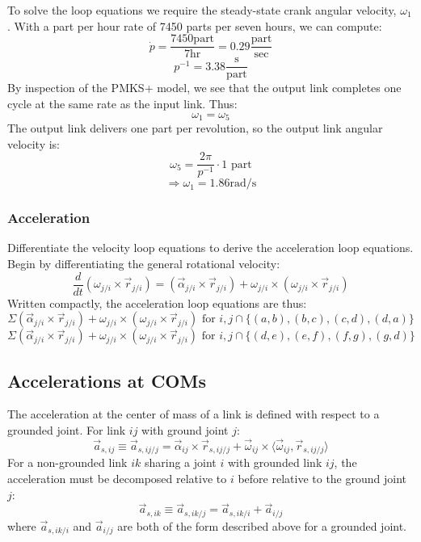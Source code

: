 \documentclass[12pt]{article}
\begin{document}
To solve the loop equations we require the steady-state crank angular velocity, $\omega_{1}$. With a part per hour rate of 7450 parts per seven hours, we can compute:
\[ \dot{p} = \frac{7450 \text{part}}{7 \text{hr}} = 0.29 \frac{\text{part}}{\text{sec}} \]
\[ p^{-1} = 3.38 \frac{\text{s}}{\text{part}} \]
By inspection of the PMKS+ model, we see that the output link completes one cycle at the same rate as the input link. Thus:
\[ \omega_{1} = \omega_{5} \]
The output link delivers one part per revolution, so the output link angular velocity is:
\[ \omega_{5} = \frac{2\pi}{p^{-1}}\cdot \text{1 part}  \]
\[ \Rightarrow \omega_{1} = 1.86 \text{rad}/\text{s} \]

\subsubsection{Acceleration}%
\label{eqns.kinematics.acceleration}

Differentiate the velocity loop equations to derive the acceleration loop equations. Begin by differentiating the general rotational velocity:
\[ \frac{d }{d t} \left( \omega_{j/i}\times \vec{r}_{j/i} \right) = (\vec{\alpha}_{j/i}\times \vec{r}_{j/i}) +  \omega_{j/i}\times (\omega_{j/i}\times \vec{r}_{j/i}) \]
Written compactly, the acceleration loop equations are thus:
\[ \Sigma (\vec{\alpha}_{j/i}\times \vec{r}_{j/i}) +  \omega_{j/i}\times (\omega_{j/i}\times \vec{r}_{j/i}) \text{ for } i,j \cap \{(a,b),(b,c),(c,d),(d,a)\} \]
\[ \Sigma (\vec{\alpha}_{j/i}\times \vec{r}_{j/i}) +  \omega_{j/i}\times (\omega_{j/i}\times \vec{r}_{j/i}) \text{ for } i,j \cap \{(d,e),(e,f),(f,g),(g,d)\} \]

\subsection{Accelerations at COMs}%
\label{eqns.accels}

The acceleration at the center of mass of a link is defined with respect to a grounded joint. For link $ij$ with ground joint $j$:
\[ \vec{a}_{s,ij} \equiv \vec{a}_{s,ij/j} = \vec{\alpha}_{ij} \times \vec{r}_{s,ij/j} + \vec{\omega}_{ij}\times \langle \vec{\omega}_{ij} , \vec{r}_{s,ij/j} \rangle \]
For a non-grounded link $ik$ sharing a joint $i$ with grounded link $ij$, the acceleration must be decomposed relative to $i$ before relative to the ground joint $j$:
\[ \vec{a}_{s,ik} \equiv \vec{a}_{s,ik/j} = \vec{a}_{s,ik/i} + \vec{a}_{i/j} \]
where $\vec{a}_{s,ik/i}$ and $\vec{a}_{i/j}$ are both of the form described above for a grounded joint.
\end{document}
